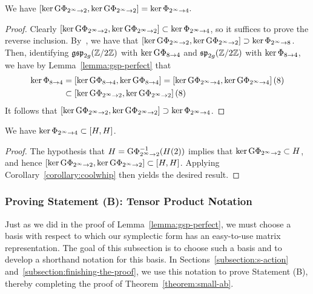 \begin{corollary} \label{corollary:coolwhip} 
	We have
	\(
		[\ker \mathrm{G}\Phi_{2^\infty \to 2}, \ker \mathrm{G}\Phi_{2^\infty \to 2}] = \ker \Phi_{2^\infty \to 4}.
	\)
\end{corollary} 
\begin{proof} 
Clearly \([\ker \mathrm{G}\Phi_{2^\infty \to 2}, \ker \mathrm{G}\Phi_{2^\infty \to 2}] \subset \ker \Phi_{2^\infty \to 4}\), so it suffices to prove the reverse inclusion. By~\cite[Lemma 2.11]{landesman-swaminathan-tao-xu:rational-families}, we have that $[\ker \mathrm{G}\Phi_{2^\infty \to 2}, \ker \mathrm{G}\Phi_{2^\infty \to 2}] \supset \ker \Phi_{2^\infty \to 8}$. Then, identifying $\mathfrak{gsp}_{2g}(\mathbb Z/ 2 \mathbb Z)$ with $\ker \mathrm{G}\Phi_{8 \to 4}$ and $\mathfrak{sp}_{2g}(\mathbb Z/2\mathbb Z)$ with $\ker \Phi_{8 \to 4}$, we have by Lemma~\ref{lemma:gsp-perfect} that
\begin{align*}
\ker \Phi_{8 \to 4} & = \left[ \ker \mathrm{G}\Phi_{8 \to 4},\ker \mathrm{G}\Phi_{8 \to 4} \right] = \left[ \ker \mathrm{G}\Phi_{2^\infty \to 4},\ker \mathrm{G}\Phi_{2^\infty \to 4} \right](8) \\
& \subset \left[ \ker \mathrm{G}\Phi_{2^\infty \to 2},\ker \mathrm{G}\Phi_{2^\infty \to 2} \right](8)
\end{align*}
It follows that $\left[ \ker \mathrm{G}\Phi_{2^\infty \to 2},\ker \mathrm{G}\Phi_{2^\infty \to 2} \right] \supset \ker \Phi_{2^\infty \to 4}$.
\end{proof} 

\begin{corollary} \label{lemma:contains-mod-4}
	We have $\ker \Phi_{2^\infty \to 4} \subset [H, H]$. 
\end{corollary}
\begin{proof} 
	The hypothesis that 
    \(
    	H = \mathrm{G}\Phi_{2^\infty \to 2}^{-1}(H(2))
    \)
    implies that $\ker \mathrm{G}\Phi_{2^\infty \to 2} \subset H$, and hence $[\ker \mathrm{G}\Phi_{2^\infty \to 2}, \ker \mathrm{G}\Phi_{2^\infty \to 2}] \subset [H, H]$. Applying Corollary~\ref{corollary:coolwhip} then yields the desired result.
\end{proof} 

\subsubsection{Proving Statement (B): Tensor Product Notation}\label{tomswifties}

Just as we did in the proof of Lemma~\ref{lemma:gsp-perfect}, we must choose a basis with respect to which our symplectic form has an easy-to-use matrix representation. The goal of this subsection is to choose such a basis and to develop a shorthand notation for this basis. In Sections~\ref{subsection:s-action} and~\ref{subsection:finishing-the-proof}, we use this notation to prove Statement (B), thereby completing the proof of Theorem~\ref{theorem:small-ab}.

